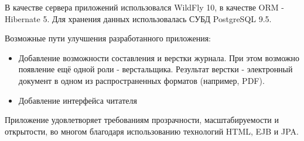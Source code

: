 В качестве сервера приложений использовался WildFly 10, в качестве ORM - Hibernate 5. Для хранения данных использовалась СУБД PostgreSQL 9.5.

Возможные пути улучшения разработанного приложения:

\begin{itemize}
\item Добавление возможности составления и верстки журнала. При этом возможно появление ещё одной роли - верстальщика. Результат верстки - электронный документ в одном из распространенных форматов (например, PDF).
\item Добавление интерфейса читателя
\end{itemize}

Приложение удовлетворяет требованиям прозрачности, масштабируемости и открытости, во многом благодаря использованию технологий HTML, EJB и JPA.